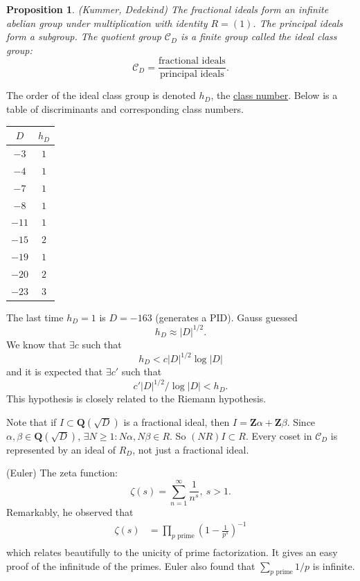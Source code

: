\documentclass[11pt, oneside]{amsart}
\numberwithin{equation}{section}
\numberwithin{theorem}{section}
\newtheorem{proposition}[theorem]{Proposition}
\theoremstyle{definition}
\def\Z{\mathbf{Z}}
\def\Q{\mathbf{Q}}
\def\Cl{\mathcal{C}}
\begin{document}
{\begin{proposition}
(Kummer, Dedekind) The fractional ideals form an infinite abelian group under multiplication with identity $R = (1)$. The principal ideals form a subgroup. The quotient group $\mathcal{C}_D$ is a finite group called the ideal class group:
$$
\Cl_D = \frac{\textrm{fractional ideals}}{\textrm{principal ideals}}.
$$
\end{proposition}
The order of the ideal class group is denoted $h_D$, the \underline{class number}. Below is a table of discriminants and corresponding class numbers.
\begin{center}
\begin{tabular}{ c|c } 
$D$ & $h_D$ \\
\hline
$-3$ & $1$ \\
\hline
$-4$ & $1$ \\
\hline
$-7$ & $1$ \\
\hline
$-8$ & $1$ \\
\hline
$-11$ & $1$ \\
\hline
$-15$ & $2$ \\
\hline
$-19$ & $1$ \\
\hline
$-20$ & $2$ \\
\hline
$-23$ & $3$ \\
\end{tabular}
\end{center}
The last time $h_D = 1$ is $D=-163$ (generates a PID). Gauss guessed  
$$
h_D \approx |D|^{1/2}.
$$
We know that $\exists c$ such that
$$
h_D < c|D|^{1/2}\log |D|
$$
and it is expected that $\exists c'$ such that
$$
c'|D|^{1/2}/\log |D| < h_D.
$$
This hypothesis is closely related to the Riemann hypothesis.

Note that if $I\subset \Q(\sqrt D)$ is a fractional ideal, then $I = \Z\alpha +\Z\beta$. Since $\alpha,\beta\in\Q(\sqrt D)$, $\exists N\geqslant 1:N\alpha,N\beta\in R$. So $(NR)I \subset R$. Every coset in $\Cl_D$ is represented by an ideal of $R_D$, not just a fractional ideal. 

(Euler) The zeta function:
$$
\zeta(s) = \sum_{n=1}^\infty \frac{1}{n^s},\ s>1.
$$
Remarkably, he observed that
\begin{align*}
\zeta(s) 	&= \prod_{p\textrm{ prime}} \left(1-\frac{1}{p^s}\right)^{-1}\\
\end{align*}
which relates beautifully to the unicity of prime factorization. It gives an easy proof of the infinitude of the primes. Euler also found that $\sum_{p\textrm{ prime}} 1/p$ is infinite.

}
\end{document}
